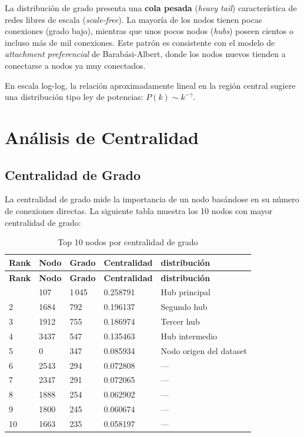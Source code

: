 \documentclass[12pt,a4paper,oneside,openany]{book}
\begin{document}
\begin{hallazgobox}
La distribución de grado presenta una \textbf{cola pesada} (\textit{heavy tail})
característica de redes libres de escala (\textit{scale-free}). La mayoría de los
nodos tienen pocas conexiones (grado bajo), mientras que unos pocos nodos
(\textit{hubs}) poseen cientos o incluso más de mil conexiones. Este patrón es
consistente con el modelo de \textit{attachment preferencial} de Barabási-Albert,
donde los nodos nuevos tienden a conectarse a nodos ya muy conectados.

En escala log-log, la relación aproximadamente lineal en la región central sugiere
una distribución tipo ley de potencias: $P(k) \sim k^{-\gamma}$.
\end{hallazgobox}


\chapter{Análisis de Centralidad}

\section{Centralidad de Grado}

La centralidad de grado mide la importancia de un nodo basándose en su número
de conexiones directas. La siguiente tabla muestra los 10 nodos con mayor
centralidad de grado:

\begin{xltabular}{\linewidth}{C{1.2cm}C{1.5cm}C{1.8cm}C{2.5cm}X}
  \caption{Top 10 nodos por centralidad de grado}\label{tab:degree}\\
  \toprule
  \textbf{Rank} & \textbf{Nodo} & \textbf{Grado} & \textbf{Centralidad} & \textbf{distribución} \\
  \midrule
  \endfirsthead
  \toprule
  \textbf{Rank} & \textbf{Nodo} & \textbf{Grado} & \textbf{Centralidad} & \textbf{distribución} \\
  \midrule
  \endhead
  \bottomrule
    & 107  & 1\,045 & 0.258791 & Hub principal \\
  2  & 1684 & 792    & 0.196137 & Segundo hub \\
  3  & 1912 & 755    & 0.186974 & Tercer hub \\
  4  & 3437 & 547    & 0.135463 & Hub intermedio \\
  5  & 0    & 347    & 0.085934 & Nodo origen del dataset \\
  6  & 2543 & 294    & 0.072808 & --- \\
  7  & 2347 & 291    & 0.072065 & --- \\
  8  & 1888 & 254    & 0.062902 & --- \\
  9  & 1800 & 245    & 0.060674 & --- \\
  10 & 1663 & 235    & 0.058197 & --- \\
  \bottomrule
\end{xltabular}
\end{document}
